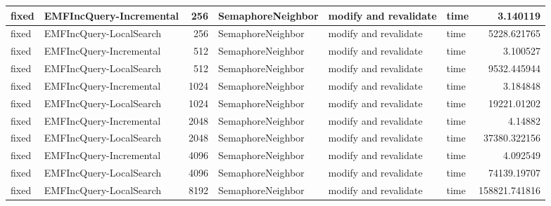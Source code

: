 \begin{table}
\begin{tabular}{| l | l | r | l | l | l | r |}
fixed & EMFIncQuery-Incremental & 256 & SemaphoreNeighbor & modify and revalidate & time & 3.140119\\\hline
fixed & EMFIncQuery-LocalSearch & 256 & SemaphoreNeighbor & modify and revalidate & time & 5228.621765\\\hline
fixed & EMFIncQuery-Incremental & 512 & SemaphoreNeighbor & modify and revalidate & time & 3.100527\\\hline
fixed & EMFIncQuery-LocalSearch & 512 & SemaphoreNeighbor & modify and revalidate & time & 9532.445944\\\hline
fixed & EMFIncQuery-Incremental & 1024 & SemaphoreNeighbor & modify and revalidate & time & 3.184848\\\hline
fixed & EMFIncQuery-LocalSearch & 1024 & SemaphoreNeighbor & modify and revalidate & time & 19221.01202\\\hline
fixed & EMFIncQuery-Incremental & 2048 & SemaphoreNeighbor & modify and revalidate & time & 4.14882\\\hline
fixed & EMFIncQuery-LocalSearch & 2048 & SemaphoreNeighbor & modify and revalidate & time & 37380.322156\\\hline
fixed & EMFIncQuery-Incremental & 4096 & SemaphoreNeighbor & modify and revalidate & time & 4.092549\\\hline
fixed & EMFIncQuery-LocalSearch & 4096 & SemaphoreNeighbor & modify and revalidate & time & 74139.19707\\\hline
fixed & EMFIncQuery-LocalSearch & 8192 & SemaphoreNeighbor & modify and revalidate & time & 158821.741816\\\hline


\end{tabular}
\end{table}
